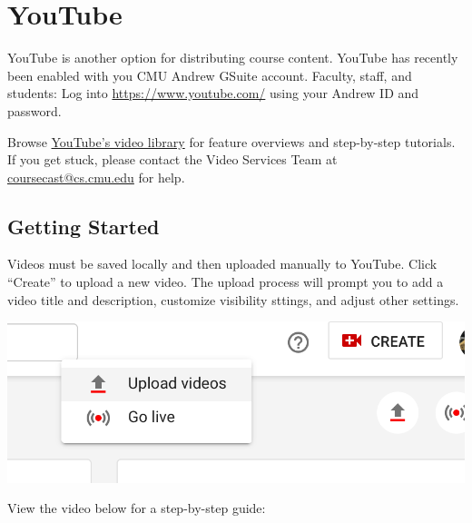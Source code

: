 \chapter{YouTube}
\label{ch:youtube}

\begin{gram}[Introduction]
\label{grm:youtube:introduction}
    YouTube is another option for distributing course content.
    YouTube has recently been enabled with you CMU Andrew GSuite account.
    Faculty, staff, and students: Log into \href{https://www.youtuube.com/}{https://www.youtube.com/} using your Andrew ID and password.
\end{gram}

\begin{note}
        Browse \href{https://www.youtube.com/user/youtubehelp?sub_confirmation=1}{YouTube's video library} for feature overviews and step-by-step tutorials.
        If you get stuck, please contact the Video Services Team at \href{mailto:coursecast@cs.cmu.edu}{coursecast@cs.cmu.edu} for help.
\end{note}




\section{Getting Started}
\label{sec:youtube:getting_started}

\begin{gram}
    Videos must be saved locally and then uploaded manually to YouTube.
    Click ``Create'' to upload a new video.
    The upload process will prompt you to add a video title and description, customize visibility sttings, and adjust other settings.

    {
        \centering
        \includegraphics[scale=0.4]{youtube/media/08-youtube-upload.png}
    }
\end{gram}

\begin{gram}
View the video below for a step-by-step guide:

\end{gram}

